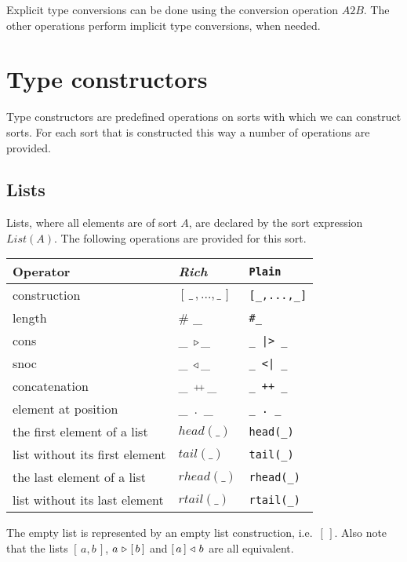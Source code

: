 \documentclass[a4paper,fleqn]{article}
\newcommand{\frm}[1]{\mbox{\ensuremath{#1}}}
\newcommand{\f}[1]{\ensuremath{\mathit{#1}}}
\newcommand{\fa}[2]{\ensuremath{\f{#1}(#2)}}
\newcommand{\lst}[1]{\ensuremath{[\,#1\,]}}
\newcommand{\el}{\ensuremath{[\,]}}
\newcommand{\cons}{\ensuremath{\hspace{0.12em}\triangleright\hspace{0.08em}}}
\newcommand{\snoc}{\ensuremath{\hspace{0.08em}\triangleleft\hspace{0.12em}}}
\newcommand{\concat}{\ensuremath{\hspace{0.12em}\raisebox{0.2ex}
{\text{\scriptsize+}\!\text{\scriptsize+}}\hspace{0.12em}}}
\begin{document}
\noindent
Explicit type conversions can be done using the conversion operation
\frm{\f{A2B}}. The other operations perform implicit type conversions, when
needed.

\section{Type constructors}
\label{sec:TypeConstructors}

Type constructors are predefined operations on sorts with which we can
construct sorts. For each sort that is constructed this way a number of
operations are provided.

\subsection{Lists}

Lists, where all elements are of sort \frm{A}, are declared by the sort
expression \frm{\fa{List}{A}}. The following operations are provided for this
sort.

\bigskip
\begin{tabular}{|l@{\qquad}L@{\qquad}l|}
\hline
Operator                       & \textit{Rich}          & \verb+Plain+\\\hline
construction                   & \lst{\_\,,\ldots,\_}   & \verb+[_,...,_]+\\
length                         & \# \_                  & \verb+#_+\\
cons                           & \_ \cons \_            & \verb+_ |> _+\\
snoc                           & \_ \snoc \_            & \verb+_ <| _+\\
concatenation                  & \_ \concat \_          & \verb-_ ++ _-\\
element at position            & \_\ .\ \_              & \verb+_ . _+\\
the first element of a list    & \fa{head}{\_}          & \verb+head(_)+\\
list without its first element & \fa{tail}{\_}          & \verb+tail(_)+\\
the last element of a list     & \fa{rhead}{\_}         & \verb+rhead(_)+\\
list without its last element  & \fa{rtail}{\_}         & \verb+rtail(_)+\\
\hline
\end{tabular}\bigskip

\noindent
The empty list is represented by an empty list construction, i.e.\ \frm{\el}.
Also note that the lists \frm{\lst{a,b}}, \frm{a \cons \lst{b}} and
\frm{\lst{a} \snoc b} are all equivalent.
\end{document}
